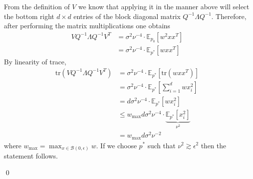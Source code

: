 \documentclass[11pt]{article}
\begin{document}
From the definition of $V$ we know that applying it in the manner above will select the bottom right $d\times d$ entries of the block diagonal matrix $Q^{-1}\Lambda Q^{-1}$. Therefore, after performing the matrix multiplications one obtains
\begin{align}
    VQ^{-1}\Lambda Q^{-1}V^T&= \sigma^2\nu^{-4} \cdot \mathbb{E}_{p_0}\left[w^2xx^T\right] \\
    &= \sigma^2\nu^{-4} \cdot \mathbb{E}_{p^*}\left[wxx^T\right]
\end{align}
By linearity of trace,
\begin{align}
    \text{tr}(VQ^{-1}\Lambda Q^{-1}V^T) &= \sigma^2\nu^{-4} \cdot \mathbb{E}_{p^*}\left[\text{tr}(wxx^T)\right] \\
    &= \sigma^2\nu^{-4} \cdot \mathbb{E}_{p^*}\left[\sum_{i = 1}^dwx_i^2\right] \\
    &= d\sigma^2\nu^{-4} \cdot \mathbb{E}_{p^*}\left[wx_i^2\right] \\
    &\leq w_{\max}d\sigma^2\nu^{-4} \cdot \underbrace{\mathbb{E}_{p^*}\left[x_i^2\right]}_{\nu^2} \\
    &= w_{\max}d\sigma^2\nu^{-2}
\end{align}
where $w_{\max} = \max_{x\in \mathcal{B}(0, \epsilon)}w.$ If we choose $p^*$ such that $\nu^2 \gtrsim \epsilon^2$ then the statement follows. 

\qed{}
\end{document}
